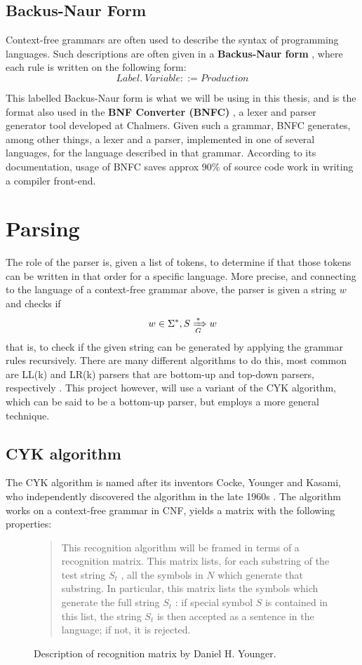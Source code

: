 \documentclass[a4paper,12pt,twosided]{report}
\begin{document}
\subsection{Backus-Naur Form}
Context-free grammars are often used to describe the syntax of programming
languages. Such descriptions are often given in a \textbf{Backus-Naur form}
\cite{backusform}, where each rule is written on the following form:
\[
Label.\ Variable ::= Production 
\]

This labelled Backus-Naur form is what we will be using in this thesis, and is
the format also used in the \textbf{BNF Converter (BNFC)} \cite{bnfc}, a lexer
and parser generator tool developed at Chalmers.  Given such a grammar, BNFC
generates, among other things, a lexer and a parser, implemented in one of
several languages, for the language described in that grammar. According to its
documentation, usage of BNFC saves approx 90\% of source code work in writing a
compiler front-end. 

\section{Parsing}
\label{parsingsection}
The role of the parser is, given a list of tokens, to determine if that those
tokens can be written in that order for a specific language. More precise, and
connecting to the language of a context-free grammar above, the parser is given
a string $w$ and checks if 
\[
w \in \Sigma^*, S \xRightarrow[G]{*} w
\]
that is, to check if the given string can be generated by applying the grammar
rules recursively. There are many different algorithms to do this, most common
are LL(k) and LR(k) parsers that are bottom-up and top-down parsers,
respectively \cite[p.192]{dragonbook}. This project however, will use a variant
of the CYK algorithm, which can be said to be a bottom-up parser, but employs a
more general technique.

\subsection{CYK algorithm}
The CYK algorithm is named after its inventors Cocke, Younger and Kasami, who
independently discovered the algorithm in the late 1960s \cite{Younger67}. The
algorithm works on a context-free grammar in CNF, yields a matrix with the
following properties:

\begin{figure}[H]
\begin{quote}
This recognition algorithm will be framed in terms of a recognition
matrix. This matrix lists, for each substring of the test string $S_t$ , all
the symbols in $N$ which generate that substring. In particular, this
matrix lists the symbols which generate the full string $S_t$ : if special
symbol $S$ is contained in this list, the string $S_t$ is then accepted as a
sentence in the language; if not, it is rejected.
\end{quote}
\caption{\label{youngerquote}Description of recognition matrix by Daniel H.
Younger.}
\end{figure}
\end{document}
